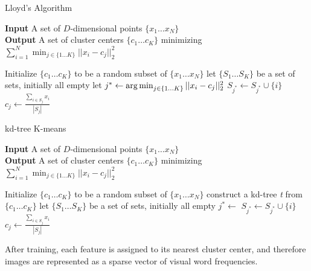 \begin{algorithm}
	\caption{Lloyd's Algorithm}\label{alg:lloyds}
	\hspace*{\algorithmicindent} \textbf{Input} A set of $D$-dimensional points $\{x_1 \ldots x_N\}$ \\
	\hspace*{\algorithmicindent} \textbf{Output} A set of cluster centers $\{c_1 \ldots c_K\}$ minimizing $\sum_{i = 1}^N {\min_{j \in \{1 \dots K\}} ||x_i - c_j||_2^2}$
	\begin{algorithmic}[1]
		\State Initialize $\{c_1 \ldots c_K\}$ to be a random subset of $\{x_1 \ldots x_N\}$
			\State let $\{S_1 \ldots S_K\}$ be a set of sets, initially all empty
				\State let $j^* \gets \operatorname*{arg\,min}_{j \in \{1 \dots K\}} ||x_i - c_j||_2^2 $
				\State $S_{j^*} \gets S_{j^*} \cup \{i\}$
			\EndFor
				\State $c_j \gets \frac{\sum_{i \in S_j}{x_i}}{|S_j|}$
			\EndFor
		\EndWhile
		\EndProcedure
	\end{algorithmic}
\end{algorithm}

\begin{algorithm}
	\caption{kd-tree K-means}\label{alg:kdtreekmeans}
	\hspace*{\algorithmicindent} \textbf{Input} A set of $D$-dimensional points $\{x_1 \ldots x_N\}$ \\
	\hspace*{\algorithmicindent} \textbf{Output} A set of cluster centers $\{c_1 \ldots c_K\}$ minimizing $\sum_{i = 1}^N {\min_{j \in \{1 \dots K\}} ||x_i - c_j||_2^2}$
	\begin{algorithmic}[1]
		\State Initialize $\{c_1 \ldots c_K\}$ to be a random subset of $\{x_1 \ldots x_N\}$
		\State construct a kd-tree \textit{t} from $\{c_1 \ldots c_K\}$
		\State let $\{S_1 \ldots S_K\}$ be a set of sets, initially all empty
		\State $j^* \gets$ 
		\State $S_{j^*} \gets S_{j^*} \cup \{i\}$
		\EndFor
		\State $c_j \gets \frac{\sum_{i \in S_j}{x_i}}{|S_j|}$
		\EndFor
		\EndWhile
		\EndProcedure
	\end{algorithmic}
\end{algorithm}

After training, each feature is assigned to its nearest cluster center, and therefore images are represented as a sparse vector of visual word frequencies.

